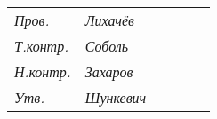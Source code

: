 \begin{tabular}{|p{15pt}|p{10pt}|p{80pt}|p{20pt}|p{20pt}|p{150pt}|p{5pt}|p{5pt}|p{5pt}|p{30pt}|p{30pt}|}
\multicolumn{2}{|p{35pt}|}{\textit{\footnotesize Пров.}} &\textit{\footnotesize Лихачёв} &\textit{\footnotesize} &\textit{\footnotesize} & \multirow{6}{170pt}{} & \multicolumn{5}{|c|}{} \tabularnewline\cline{1-5}

\multicolumn{2}{|p{35pt}|}{\textit{\footnotesize Т.контр.}} &\textit{\footnotesize Соболь} &\textit{\footnotesize} &\textit{\footnotesize} & \multirow{6}{170pt}{} &  \multicolumn{5}{|c|}{} \tabularnewline\cline{1-5}

\multicolumn{2}{|p{35pt}|}{\textit{\footnotesize Н.контр.}} &\textit{\footnotesize Захаров} &\textit{\footnotesize} &\textit{\footnotesize} & \multirow{6}{170pt}{} &  \multicolumn{5}{|c|}{} \tabularnewline\cline{1-5}

\multicolumn{2}{|p{35pt}|}{\textit{\footnotesize Утв.}} &\textit{\footnotesize Шункевич} &\textit{\footnotesize} &\textit{\footnotesize} & \multirow{6}{170pt}{} & \multicolumn{5}{|c|}{} \tabularnewline\hline

\end{tabular}
\restoregeometry
